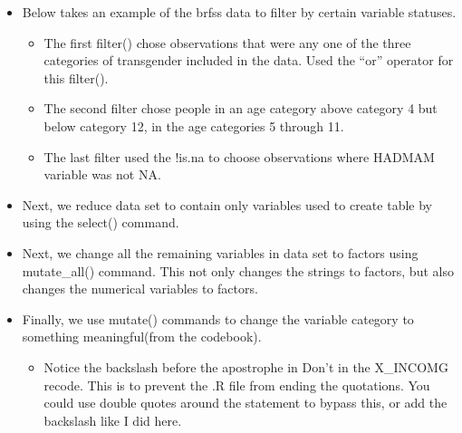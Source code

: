 \documentclass[
  letterpaper,
  DIV=11,
  numbers=noendperiod]{scrreprt}
\providecommand{\tightlist}{%
  \setlength{\itemsep}{0pt}\setlength{\parskip}{0pt}}\usepackage{longtable,booktabs,array}
\begin{document}
\begin{itemize}
\item
  Below takes an example of the brfss data to filter by certain variable
  statuses.

  \begin{itemize}
  \tightlist
  \item
    The first filter() chose observations that were any one of the three
    categories of transgender included in the data. Used the \textbar{}
    ``or'' operator for this filter().
  \item
    The second filter chose people in an age category above category 4
    but below category 12, in the age categories 5 through 11.
  \item
    The last filter used the !is.na to choose observations where HADMAM
    variable was not NA.
  \end{itemize}
\item
  Next, we reduce data set to contain only variables used to create
  table by using the select() command.
\item
  Next, we change all the remaining variables in data set to factors
  using mutate\_all() command. This not only changes the strings to
  factors, but also changes the numerical variables to factors.
\item
  Finally, we use mutate() commands to change the variable category to
  something meaningful(from the codebook).

  \begin{itemize}
  \tightlist
  \item
    Notice the backslash before the apostrophe in Don't in the X\_INCOMG
    recode. This is to prevent the .R file from ending the quotations.
    You could use double quotes around the statement to bypass this, or
    add the backslash like I did here.
  \end{itemize}


\end{itemize}
\end{document}
